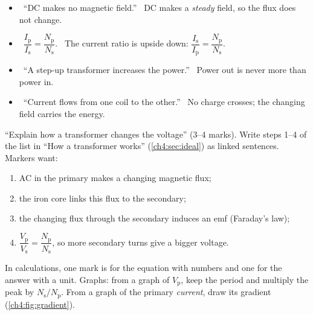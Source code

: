 \begin{mistakes}
\begin{itemize}
  \item \xmark\ ``DC makes no magnetic field.'' \cmark\ DC makes a \emph{steady} field,
        so the flux does not change.
  \item \xmark\ $\dfrac{I_\mathrm{p}}{I_\mathrm{s}} = \dfrac{N_\mathrm{p}}{N_\mathrm{s}}$.
        \cmark\ The current ratio is upside down:
        $\dfrac{I_\mathrm{s}}{I_\mathrm{p}} = \dfrac{N_\mathrm{p}}{N_\mathrm{s}}$.
  \item \xmark\ ``A step-up transformer increases the power.''
        \cmark\ Power out is never more than power in.
  \item \xmark\ ``Current flows from one coil to the other.''
        \cmark\ No charge crosses; the changing field carries the energy.
\end{itemize}
\end{mistakes}

\begin{examtip}
``Explain how a transformer changes the voltage'' (3--4 marks). Write steps 1--4 of the
list in ``How a transformer works'' (\cref{ch4:sec:ideal}) as linked sentences. Markers
want:
\begin{enumerate}
  \item AC in the primary makes a changing magnetic flux;
  \item the iron core links this flux to the secondary;
  \item the changing flux through the secondary induces an emf (Faraday's law);
  \item $\dfrac{V_\mathrm{p}}{V_\mathrm{s}} = \dfrac{N_\mathrm{p}}{N_\mathrm{s}}$, so more
        secondary turns give a bigger voltage.
\end{enumerate}
In calculations, one mark is for the equation with numbers and one for the answer with a
unit. Graphs: from a graph of $V_\mathrm{p}$, keep the period and multiply the peak by
$N_\mathrm{s}/N_\mathrm{p}$. From a graph of the primary \emph{current}, draw its gradient
(\cref{ch4:fig:gradient}).
\end{examtip}

